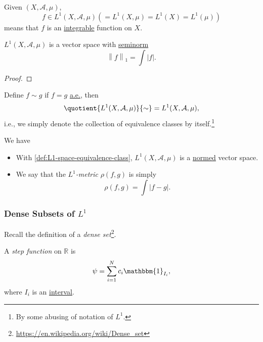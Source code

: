 \begin{definition}[\(L^1\) Space]\label{def:L1-space}
	Given \((X, \mathcal{A} , \mu )\),
	\[
		f\in L^1(X, \mathcal{A} , \mu )\left( = L^1(X, \mu ) = L^1(X) = L^1(\mu )\right)
	\]
	means that \(f\) is an \hyperref[def:integrable]{integrable} function on \(X\).
\end{definition}

\begin{lemma}
	\(L^1(X, \mathcal{A} , \mu )\) is a vector space with \hyperref[def:seminorm]{seminorm}
	\[
		\left\lVert f\right\rVert _1 = \int \left\vert f \right\vert .
	\]
\end{lemma}
\begin{proof}
\end{proof}

\begin{definition}\label{def:L1-space-equivalence-class}
	Define \(f\sim g\) if \(f = g\) \hyperref[def:mu-almost-everywhere]{a.e.}, then
	\[
		\quotient{L^1(X, \mathcal{A} , \mu )}{\sim} = L^1(X, \mathcal{A} , \mu ),
	\]
	i.e., we simply denote the collection of equivalence classes by itself.\footnote{By some abusing of notation of \(L^1\).}
\end{definition}
\begin{remark}
	We have
	\begin{itemize}
		\item With \autoref{def:L1-space-equivalence-class}, \(L^1(X, \mathcal{A} , \mu )\) is a \hyperref[def:norm]{normed} vector space.
		\item \label{def:L-1-metric} We say that the \emph{\(L^1\)-metric} \(\rho (f, g)\) is simply
		      \[
			      \rho (f, g) = \int \left\vert f - g \right\vert.
		      \]
	\end{itemize}
\end{remark}

\subsubsection{Dense Subsets of \(L^1\)}
\begin{note}
	Recall the definition of a \emph{dense set}\footnote{\url{https://en.wikipedia.org/wiki/Dense_set}}.
\end{note}

\begin{definition}\label{def:step-function}
	A \emph{step function} on \(\mathbb{R} \) is
	\[
		\psi = \sum\limits_{i=1}^{N} c_{i}\mathbbm{1}_{I_{i}},
	\]
	where \(I_{i}\) is an \underline{interval}.
\end{definition}

